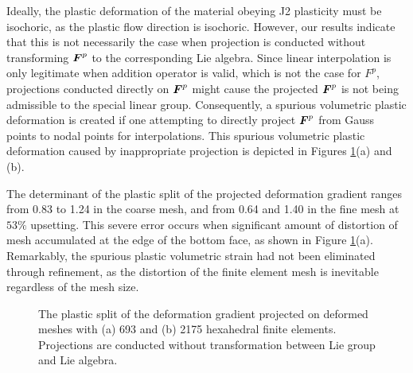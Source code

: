 \documentclass[12pt]{article}
\begin{document}
Ideally, the plastic deformation of the material obeying J2 plasticity
must be isochoric, as the plastic flow direction is
isochoric. However, our results indicate that this is not necessarily
the case when projection is conducted without transforming ${\boldsymbol{F}}^{p}$
to the corresponding Lie algebra. Since linear interpolation is only
legitimate when addition operator is valid, which is not the case for
$F^{p}$, projections conducted directly on ${\boldsymbol{F}}^{p}$ might cause the
projected ${\boldsymbol{F}}^{p}$ is not being admissible to the special linear
group. Consequently, a spurious volumetric plastic deformation is
created if one attempting to directly project ${\boldsymbol{F}}^{p}$ from Gauss
points to nodal points for interpolations. This spurious volumetric
plastic deformation caused by inappropriate projection is depicted in
Figures \ref{fig:BilletNOLie}(a) and (b).

The determinant of the plastic split of the projected deformation
gradient ranges from 0.83 to 1.24 in the coarse mesh, and from 0.64
and 1.40 in the fine mesh at $53\%$ upsetting. This severe error
occurs when significant amount of distortion of mesh accumulated at
the edge of the bottom face, as shown in Figure
\ref{fig:BilletNOLie}(a). Remarkably, the spurious plastic volumetric
strain had not been eliminated through refinement, as the distortion
of the finite element mesh is inevitable regardless of the mesh size.
\begin{figure}[htbp]
  \begin{center}
    \unitlength=1.0mm
    \caption{The plastic split of the deformation gradient projected
      on deformed meshes with (a) 693 and (b) 2175 hexahedral finite
      elements. Projections are conducted without transformation
      between Lie group and Lie algebra.}
    \label{fig:BilletNOLie}
  \end{center}
\end{figure}
\end{document}
